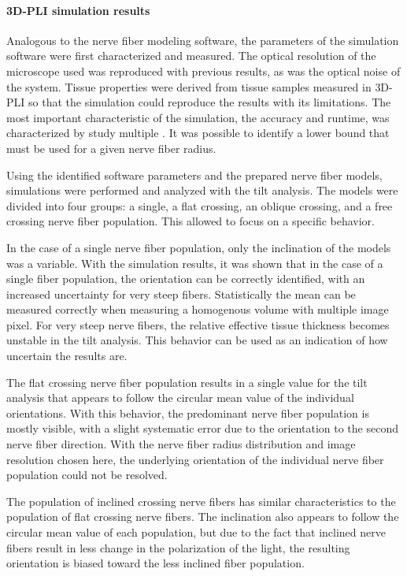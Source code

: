 \paragraph{\acs{3D-PLI} simulation results}
% 
Analogous to the nerve fiber modeling software, the parameters of the simulation software were first characterized and measured.
The optical resolution of the microscope used was reproduced with previous results, as was the optical noise of the system.
Tissue properties were derived from tissue samples measured in \ac{3D-PLI} so that the simulation could reproduce the results with its limitations.
The most important characteristic of the simulation, the accuracy and runtime, was characterized by study multiple \Voxelsize{}.
It was possible to identify a lower bound that must be used for a given nerve fiber radius.
\par
% 
Using the identified software parameters and the prepared nerve fiber models, simulations were performed and analyzed with the tilt analysis.
The models were divided into four groups: a single, a flat crossing, an oblique crossing, and a free crossing nerve fiber population.
This allowed to focus on a specific behavior.
\par
% 
In the case of a single nerve fiber population, only the inclination of the models was a variable.
With the simulation results, it was shown that in the case of a single fiber population, the orientation can be correctly identified, with an increased uncertainty for very steep fibers.
Statistically the mean can be measured correctly when measuring a homogenous volume with multiple image pixel.
For very steep nerve fibers, the relative effective tissue thickness becomes unstable in the tilt analysis.
This behavior can be used as an indication of how uncertain the results are.
\par
% 
The flat crossing nerve fiber population results in a single value for the tilt analysis that appears to follow the circular mean value of the individual orientations.
With this behavior, the predominant nerve fiber population is mostly visible, with a slight systematic error due to the orientation to the second nerve fiber direction.
With the nerve fiber radius distribution and image resolution chosen here, the underlying orientation of the individual nerve fiber population could not be resolved.
\par
% 
The population of inclined crossing nerve fibers has similar characteristics to the population of flat crossing nerve fibers.
The inclination also appears to follow the circular mean value of each population, but due to the fact that inclined nerve fibers result in less change in the polarization of the light, the resulting orientation is biased toward the less inclined fiber population.
